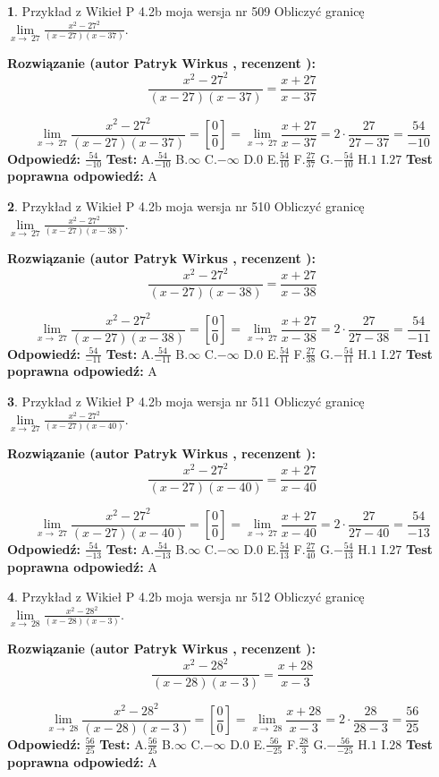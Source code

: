 \documentclass[12pt, a4paper]{article}
\theoremstyle{definition} %
\newtheorem{zad}{}
\newcommand{\zadStart}[1]{\begin{zad}#1\newline}
\newcommand{\zadStop}{\end{zad}}
\newcommand{\rozwStart}[2]{\noindent \textbf{Rozwiązanie (autor #1 , recenzent #2): }\newline}
\newcommand{\rozwStop}{\newline}
\newcommand{\odpStart}{\noindent \textbf{Odpowiedź:}\newline}
\newcommand{\odpStop}{\newline}
\newcommand{\testStart}{\noindent \textbf{Test:}\newline}
\newcommand{\testStop}{\newline}
\newcommand{\kluczStart}{\noindent \textbf{Test poprawna odpowiedź:}\newline}
\newcommand{\kluczStop}{\newline}
\begin{document}
\zadStart{Przykład z Wikieł P 4.2b moja wersja nr 509}
Obliczyć granicę $\lim\limits_{x\to\ 27}\frac{x^{2}-27^{2}}{(x-27)(x-37)}$.
\zadStop
\rozwStart{Patryk Wirkus}{}
$$\frac{x^{2}-27^{2}}{(x-27)(x-37)}=\frac{x+27}{x-37}$$

$$\lim\limits_{x\to\ 27}\frac{x^{2}-27^{2}}{(x-27)(x-37)}=[\frac{0}{0}]=\lim\limits_{x\to\ 27}\frac{x+27}{x-37}=2 \cdot \frac{27}{27-37} = \frac{54}{-10}$$
\rozwStop
\odpStart
$\frac{54}{-10}$
\odpStop
\testStart
A.$\frac{54}{-10}$
B.$\infty$
C.$-\infty$
D.$0$
E.$\frac{54}{10}$
F.$\frac{27}{37}$
G.$-\frac{54}{10}$
H.$1$
I.$27$
\testStop
\kluczStart
A
\kluczStop



\zadStart{Przykład z Wikieł P 4.2b moja wersja nr 510}
Obliczyć granicę $\lim\limits_{x\to\ 27}\frac{x^{2}-27^{2}}{(x-27)(x-38)}$.
\zadStop
\rozwStart{Patryk Wirkus}{}
$$\frac{x^{2}-27^{2}}{(x-27)(x-38)}=\frac{x+27}{x-38}$$

$$\lim\limits_{x\to\ 27}\frac{x^{2}-27^{2}}{(x-27)(x-38)}=[\frac{0}{0}]=\lim\limits_{x\to\ 27}\frac{x+27}{x-38}=2 \cdot \frac{27}{27-38} = \frac{54}{-11}$$
\rozwStop
\odpStart
$\frac{54}{-11}$
\odpStop
\testStart
A.$\frac{54}{-11}$
B.$\infty$
C.$-\infty$
D.$0$
E.$\frac{54}{11}$
F.$\frac{27}{38}$
G.$-\frac{54}{11}$
H.$1$
I.$27$
\testStop
\kluczStart
A
\kluczStop



\zadStart{Przykład z Wikieł P 4.2b moja wersja nr 511}
Obliczyć granicę $\lim\limits_{x\to\ 27}\frac{x^{2}-27^{2}}{(x-27)(x-40)}$.
\zadStop
\rozwStart{Patryk Wirkus}{}
$$\frac{x^{2}-27^{2}}{(x-27)(x-40)}=\frac{x+27}{x-40}$$

$$\lim\limits_{x\to\ 27}\frac{x^{2}-27^{2}}{(x-27)(x-40)}=[\frac{0}{0}]=\lim\limits_{x\to\ 27}\frac{x+27}{x-40}=2 \cdot \frac{27}{27-40} = \frac{54}{-13}$$
\rozwStop
\odpStart
$\frac{54}{-13}$
\odpStop
\testStart
A.$\frac{54}{-13}$
B.$\infty$
C.$-\infty$
D.$0$
E.$\frac{54}{13}$
F.$\frac{27}{40}$
G.$-\frac{54}{13}$
H.$1$
I.$27$
\testStop
\kluczStart
A
\kluczStop



\zadStart{Przykład z Wikieł P 4.2b moja wersja nr 512}
Obliczyć granicę $\lim\limits_{x\to\ 28}\frac{x^{2}-28^{2}}{(x-28)(x-3)}$.
\zadStop
\rozwStart{Patryk Wirkus}{}
$$\frac{x^{2}-28^{2}}{(x-28)(x-3)}=\frac{x+28}{x-3}$$

$$\lim\limits_{x\to\ 28}\frac{x^{2}-28^{2}}{(x-28)(x-3)}=[\frac{0}{0}]=\lim\limits_{x\to\ 28}\frac{x+28}{x-3}=2 \cdot \frac{28}{28-3} = \frac{56}{25}$$
\rozwStop
\odpStart
$\frac{56}{25}$
\odpStop
\testStart
A.$\frac{56}{25}$
B.$\infty$
C.$-\infty$
D.$0$
E.$\frac{56}{-25}$
F.$\frac{28}{3}$
G.$-\frac{56}{-25}$
H.$1$
I.$28$
\testStop
\kluczStart
A
\kluczStop
\end{document}
